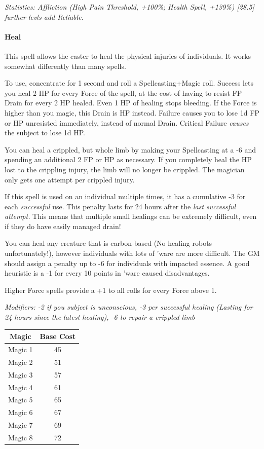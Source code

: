 \begin{multicols}{3}
	\textcolor{OliveGreen}{\textit{Statistics: Affliction (High Pain Threshold, +100\%; Health Spell, +139\%) [28.5] further levls add Reliable. }}
	
	\paragraph{Heal}
	
	This spell allows the caster to heal the physical injuries of individuals. It works somewhat differently than many spells.
	
	To use, concentrate for 1 second and roll a Spellcasting+Magic roll. Success lets you heal 2 HP for every Force of the spell, at the cost of having to resist FP Drain for every 2 HP healed. Even 1 HP of healing stops bleeding. If the Force is higher than you magic, this Drain is HP instead. Failure causes you to lose 1d FP or HP unresisted immediately, instead of normal Drain. Critical Failure \textit{causes} the subject to lose 1d HP.
	
	You can heal a crippled, but whole limb by making your Spellcasting at a -6 and spending an additional 2 FP or HP as necessary. If you completely heal the HP lost to the crippling injury, the limb will no longer be crippled. The magician only gets one attempt per crippled injury.
	
	If this spell is used on an individual multiple times, it has a cumulative -3 for each \textit{successful} use. This penalty lasts for 24 hours after the \textit{last successful attempt.} This means that multiple small healings can be extremely difficult, even if they do have easily managed drain!
	
	You can heal any creature that is carbon-based (No healing robots unfortunately!), however individuals with lots of 'ware are more difficult. The GM should assign a penalty up to -6 for individuals with impacted essence. A good heuristic is a -1 for every 10 points in 'ware caused disadvantages.
	
	Higher Force spells provide a +1 to all rolls for every Force above 1.
	
	\textcolor{NavyBlue}{\textit{Modifiers: -2 if you subject is unconscious, -3 per successful healing (Lasting for 24 hours since the latest healing), -6 to repair a crippled limb}}
		 
	\begin{center}
		\begin{tabular}{|c|c|}
			\hline
			Magic & Base Cost \\
			\hline
			\hline
			Magic 1 & 45 \\
			Magic 2 & 51 \\
			Magic 3 & 57 \\
			Magic 4 & 61 \\
			Magic 5 & 65 \\
			Magic 6 & 67 \\
			Magic 7 & 69 \\
			Magic 8 & 72 \\
			\hline
		\end{tabular}
	\end{center}
	

\end{multicols}
